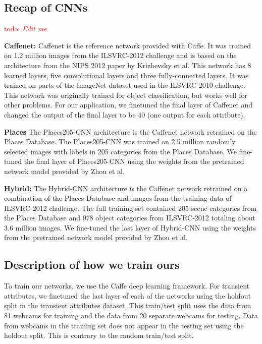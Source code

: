 \documentclass{article}
\newcommand{\todo}[1]{\textcolor{red}{todo: {\em #1}}}
\begin{document}
\subsection{Recap of CNNs}

\todo{Edit me}

\textbf{Caffenet:} Caffenet is the reference network provided with 
Caffe\cite{caffe14}.  It was trained on 1.2 million images from the 
ILSVRC-2012\cite{ILSVRCarxiv14} challenge and is based on the architecture from 
the NIPS 2012 paper by Krizhevsky\cite{caffenetnips12} et al.  This network has 
8 learned layers, five convolutional layers and three fully-connected layers.  
It was trained on parts of the ImageNet dataset used in the 
ILSVRC-2010\cite{ILSVRCarxiv14} challenge.  This network was originally trained 
for object classification, but works well for other problems. For our application, 
we finetuned the final layer of Caffenet and changed the output of the final 
layer to be 40 (one output for each attribute).

\textbf{Places} The Places205-CNN architecture is the Caffenet network retrained on 
the Places Database\cite{zhou2014places}.  The Places205-CNN was trained on 2.5
million randomly selected images with labels in 205 categories from the Places 
Database.  We fine-tuned the final layer of Places205-CNN using the weights from the
pretrained network model provided by Zhou\cite{zhou2014places} et al.

\textbf{Hybrid:} The Hybrid-CNN architecture is the Caffenet network retrained on
a combination of the Places Database\cite{zhou2014places} and images from the 
training data of ILSVRC-2012\cite{ILSVRCarxiv14} challenge.  The full training set
contained 205 scene categories from the Places Database and 978 object categories
from ILSVRC-2012 totaling about 3.6 million images.  We fine-tuned the last 
layer of Hybrid-CNN using the weights from the pretrained network model provided by 
Zhou\cite{zhou2014places} et al.

\subsection{Description of how we train ours}
\indent

To train our networks, we use the Caffe\cite{caffe14} deep learning framework. 
For transient attributes, we finetuned the last layer of each of the networks using 
the holdout split in the transient attributes dataset.  This train/test split uses
the data from 81 webcams for training and the data from 20 separate 
webcams for testing.  Data from webcams in the training set does not
appear in the testing set using the holdout split.  This is contrary to 
the random train/test split.  
\end{document}
